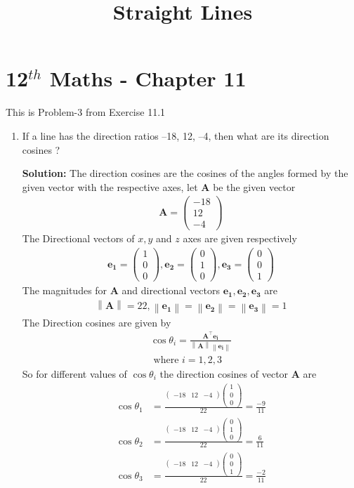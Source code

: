 \documentclass[12pt]{article}
\providecommand{\norm}[1]{\left\lVert#1\right\rVert}
\newcommand{\solution}{\noindent \textbf{Solution: }}
\newcommand{\myvec}[1]{\ensuremath{\begin{pmatrix}#1\end{pmatrix}}}
\let\vec\mathbf
\begin{document}
\begin{center}
\enlargethispage{-4cm}
\title{\textbf{Straight Lines}}
\date{\vspace{-5ex}} %
\maketitle
\end{center}
\setcounter{page}{1}
\section*{12$^{th}$ Maths - Chapter 11}
This is Problem-3 from Exercise 11.1
\begin{enumerate}
\item If a line has the direction ratios –18, 12, –4, then what are its direction cosines ?

\solution The direction cosines are the cosines of the angles formed by the given vector with the respective axes, let $\vec{A}$ be the given vector
\begin{align}
	\vec{A} =\myvec{-18\\12\\-4}
\end{align}
The Directional vectors of $x,y$ and $z$ axes are given respectively 
\begin{align}
		\vec{e_1} =\myvec{1\\0\\0},\vec{e_2}=\myvec{0\\1\\0},\vec{e_3} =\myvec{0\\0\\1}
\end{align}
		The magnitudes for $\vec{A}$ and directional vectors $\vec{e_1},\vec{e_2},\vec{e_3}$ are
	\begin{align}
\norm{\vec{A}} =22,\norm{\vec{e_1}}=\norm{\vec{e_2}}=\norm{\vec{e_3}}=1
	\end{align}
The Direction cosines are given by
\begin{align}
	\cos\theta_i=\frac{\vec{A}^\top\vec{e_i}}{\norm{\vec{A}}\norm{\vec{e_i}}}\\
	\text{ where }i=1,2,3  
\end{align}
		So for different values of $\cos\theta_i$ the direction cosines of vector $\vec{A}$ are
\begin{align}
	\cos\theta_1 &=\frac{\myvec{-18&12&-4}\myvec{1\\0\\0}}{22}=\frac{-9}{11}\\
	\cos\theta_2 &=\frac{\myvec{-18&12&-4}\myvec{0\\1\\0}}{22}=\frac{6}{11}\\
	\cos\theta_3 &=\frac{\myvec{-18&12&-4}\myvec{0\\0\\1}}{22}=\frac{-2}{11}
\end{align}
\end{enumerate}
\end{document}
